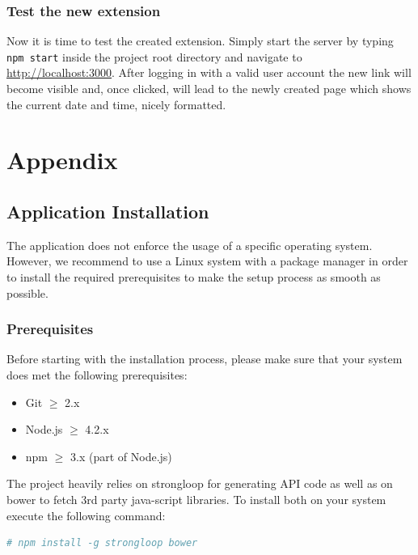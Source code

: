 \documentclass[nochapterpage,nopartpage,noheadingspace,numbersubsubsec,bigchapter,colorback,accentcolor=tud9c,10pt]{tudreport}
\begin{document}
  \section{Test the new extension}
  \label{sec:tech:handson:test}

    Now it is time to test the created extension. Simply start the server by typing \texttt{npm start} inside the project root directory and navigate to \url{http://localhost:3000}. After logging in with a valid user account the new link will become visible and, once clicked, will lead to the newly created page which shows the current date and time, nicely formatted.

\part{Appendix}
\label{part:appendix}

\appendix

  \chapter{Application Installation}
  \label{ch:appendix:setup}

    The application does not enforce the usage of a specific operating system. However, we recommend to use a Linux system with a package manager in order to install the required prerequisites to make the setup process as smooth as possible.

  \section{Prerequisites}
  \label{sec:appendix:setup:prerequisites}

    Before starting with the installation process, please make sure that your system does met the following prerequisites:
        \begin{multicols}{2}
        \begin{itemize}
            \item Git $\ge$ 2.x
            \item Node.js $\ge$ 4.2.x
            \item npm $\ge$ 3.x (part of Node.js)
        \end{itemize}
        \end{multicols}

    \noindent The project heavily relies on strongloop for generating API code as well as on bower to fetch 3rd party java-script libraries. To install both on your system execute the following command:
        \begin{lstlisting}[language=bash]
    # npm install -g strongloop bower
        \end{lstlisting}
\end{document}
